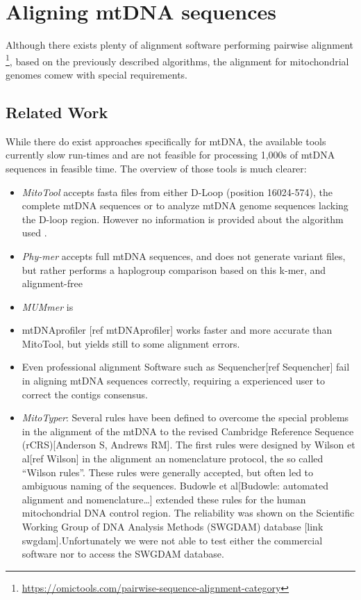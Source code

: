 \section{Aligning mtDNA sequences}
Although there exists plenty of alignment software performing pairwise alignment \footnote{\url{https://omictools.com/pairwise-sequence-alignment-category}}, based on the previously described algorithms, the alignment for mitochondrial genomes comew with special requirements. 
\subsection{Related Work}
While there do exist approaches specifically for mtDNA, the available tools currently slow run-times and are not feasible for processing 1,000s of mtDNA sequences in feasible time. The overview of those tools is much clearer:
\begin{itemize}
\item \textit{MitoTool} accepts fasta files from either D-Loop (position 16024-574), the complete mtDNA sequences or to analyze mtDNA genome sequences lacking the D-loop region. However no information is provided about the algorithm used \cite{Fan2011,Fan2013}.
\item \textit{Phy-mer} accepts full mtDNA sequences, and does not generate variant files, but rather performs a haplogroup comparison based on this k-mer, and alignment-free  
\item \textit{MUMmer} is  
\item mtDNAprofiler [ref mtDNAprofiler] works faster and more accurate than MitoTool, but yields still to some alignment errors. 
\item Even professional alignment Software such as Sequencher[ref Sequencher] fail in aligning mtDNA sequences correctly, requiring a experienced user to correct the contigs consensus. 
\item \textit{MitoTyper}: Several rules have been defined to overcome the special problems in the alignment of the mtDNA to the revised Cambridge Reference Sequence (rCRS)[Anderson S, Andrews RM]. The first rules were designed by Wilson et al[ref Wilson] in the alignment an nomenclature protocol, the so called “Wilson rules”. These rules were generally accepted, but often led to ambiguous naming of the sequences. Budowle et al[Budowle: automated alignment and nomenclature…] extended these rules for the human mitochondrial DNA control region. The reliability was shown on the Scientific Working Group of DNA Analysis Methods (SWGDAM) database [link swgdam].Unfortunately we were not able to test either the commercial software nor to access the SWGDAM database. 
\end{itemize}
